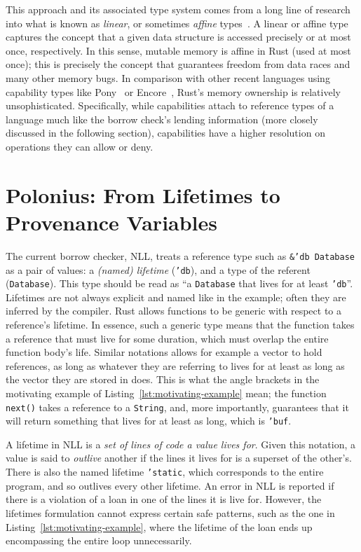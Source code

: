 \documentclass[11pt,a4paper,twoside,openany]{report}
\newcommand{\InRust}[1]{\texttt{#1}}
\renewcommand\_{\textunderscore\allowbreak}
\begin{document}
This approach and its associated type system comes from a long line of research
into what is known as \textit{linear}, or sometimes \textit{affine}
types~\cite{wadler1990linear}. A linear or affine type captures the concept that
a given data structure is accessed precisely or at most once, respectively. In
this sense, mutable memory is affine in Rust (used at most once); this is
precisely the concept that guarantees freedom from data races and many other
memory bugs. In comparison with other recent languages using capability types
like Pony~\cite{clebsch2015pony, Clebsch:2015:DCS:2824815.2824816} or
Encore~\cite{castegren2018capability}, Rust's memory ownership is relatively
unsophisticated. Specifically, while capabilities attach to reference types of a
language much like the borrow check's lending information (more closely
discussed in the following section), capabilities have a higher resolution on
operations they can allow or deny.

\section{Polonius: From Lifetimes to Provenance
  Variables}\label{sec:reference-provenance}

The current borrow checker, NLL, treats a reference type such as
\InRust{&'db Database} as a pair of values: a \textit{(named) lifetime}
(\InRust{'db}), and a type of the referent (\InRust{Database}). This type should
be read as ``a \InRust{Database} that lives for at least \InRust{'db}''.
Lifetimes are not always explicit and named like in the example; often they are
inferred by the compiler. Rust allows functions to be generic with respect to a
reference's lifetime. In essence, such a generic type means that the function
takes a reference that must live for some duration, which must overlap the
entire function body's life. Similar notations allows for example a vector to
hold references, as long as whatever they are referring to lives for at least as
long as the vector they are stored in does. This is what the angle brackets in
the motivating example of Listing~\ref{lst:motivating-example} mean; the
function \InRust{next()} takes a reference to a \InRust{String}, and, more
importantly, guarantees that it will return something that lives for at least as
long, which is \InRust{'buf}.

A lifetime in NLL is a \textit{set of lines of code a value lives for}. Given
this notation, a value is said to \textit{outlive} another if the lines it lives
for is a superset of the other's. There is also the named lifetime
\InRust{'static}, which corresponds to the entire program, and so outlives every
other lifetime. An error in NLL is reported if there is a violation of a loan in
one of the lines it is live for. However, the lifetimes formulation cannot
express certain safe patterns, such as the one in
Listing~\ref{lst:motivating-example}, where the lifetime of the loan ends up
encompassing the entire loop unnecessarily.
\end{document}
